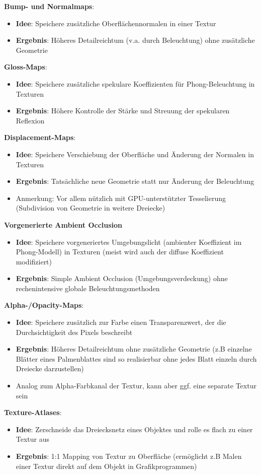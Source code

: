 \documentclass[10pt,a4paper]{article}
\begin{document}
	\textbf{Bump- und Normalmaps}:
	\begin{itemize}
		\item \textbf{Idee}: Speichere zusätzliche Oberflächennormalen in einer Textur
		\item \textbf{Ergebnis}: Höheres Detailreichtum (v.a. durch Beleuchtung) ohne zusätzliche Geometrie
	\end{itemize}
	\textbf{Gloss-Maps}:
	\begin{itemize}
		\item \textbf{Idee}: Speichere zusätzliche spekulare Koeffizienten für Phong-Beleuchtung in Texturen
		\item \textbf{Ergebnis}: Höhere Kontrolle der Stärke und Streuung der spekularen Reflexion
	\end{itemize}
	\textbf{Displacement-Maps}:
	\begin{itemize}
		\item \textbf{Idee}: Speichere Verschiebung der Oberfläche und Änderung der Normalen in Texturen
		\item \textbf{Ergebnis}: Tatsächliche neue Geometrie statt nur Änderung der Beleuchtung
		\item Anmerkung: Vor allem nützlich mit GPU-unterstützter Tesselierung (Subdivision von Geometrie in weitere Dreiecke)
	\end{itemize}
	\textbf{Vorgenerierte Ambient Occlusion}
	\begin{itemize}
		\item \textbf{Idee}: Speichere vorgeneriertes Umgebungslicht (ambienter Koeffizient im Phong-Modell) in Texturen (meist wird auch der diffuse Koeffizient modifiziert)
		\item \textbf{Ergebnis}: Simple Ambient Occlusion (Umgebungsverdeckung) ohne rechenintensive globale Beleuchtungsmethoden
	\end{itemize}
	\newpage
	\textbf{Alpha-/Opacity-Maps}:
	\begin{itemize}
		\item \textbf{Idee}: Speichere zusätzlich zur Farbe einen Transparenzwert, der die Durchsichtigkeit des Pixels beschreibt
		\item \textbf{Ergebnis}: Höheres Detailreichtum ohne zusätzliche Geometrie (z.B einzelne Blätter eines Palmenblattes sind so realisierbar ohne jedes Blatt einzeln durch Dreiecke darzustellen)
		\item Analog zum Alpha-Farbkanal der Textur, kann aber ggf. eine separate Textur sein
	\end{itemize}
	\textbf{Texture-Atlases}:
	\begin{itemize}
		\item \textbf{Idee}: Zerschneide das Dreiecksnetz eines Objektes und rolle es flach zu einer Textur aus
		\item \textbf{Ergebnis}: 1:1 Mapping von Textur zu Oberfläche (ermöglicht z.B Malen einer Textur direkt auf dem Objekt in Grafikprogrammen)
	\end{itemize}
\end{document}
